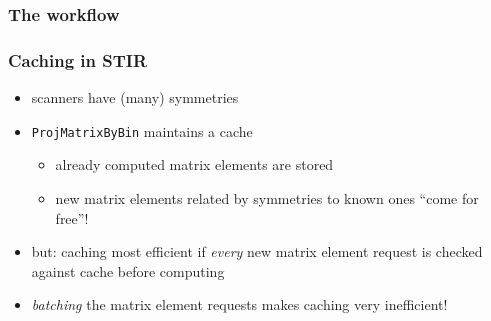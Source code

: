 \documentclass{beamer}
\begin{document}
\begin{frame}
  \frametitle{The workflow}
  \begin{figure}
    \centering
  \end{figure}
\end{frame}

\begin{frame}
  \frametitle{Caching in STIR}
  \begin{itemize}
  \item scanners have (many) symmetries
  \item \texttt{ProjMatrixByBin} maintains a cache
    \begin{itemize}
    \item already computed matrix elements are stored
    \item new matrix elements related by symmetries to known ones ``come for free''!
    \end{itemize}
  \item but: caching most efficient if \textsl{every} new matrix element request is checked against cache before computing
  \item \textsl{batching} the matrix element requests makes caching very inefficient!
  \end{itemize}
\end{frame}
\end{document}
